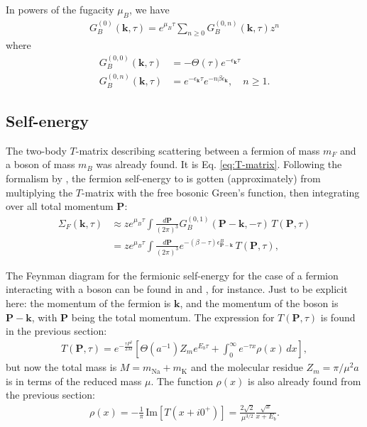\documentclass{article}
\theoremstyle{definition}
\begin{document}
\noindent In powers of the fugacity $\mu_B$, we have
\begin{align}
G^{(0)}_B(\mathbf{k}, \tau) = e^{\mu_B \tau} \sum_{n\geq 0} G_B^{(0,n)} (\mathbf{k}, \tau) z^n
\end{align}
where
\begin{align}
G_B^{(0,0)} (\mathbf{k}, \tau) &= -\Theta(\tau)e^{-\epsilon_\mathbf{k}\tau} \\
G_B^{(0,n)} (\mathbf{k}, \tau) &= e^{-\epsilon_\mathbf{k}\tau} e^{-n\beta \epsilon_\mathbf{k}}, \quad n\geq 1.
\end{align} 


\subsection{Self-energy}

\noindent The two-body $T$-matrix describing scattering between a fermion of mass $m_F$ and a boson of mass $m_B$ was already found. It is Eq. \eqref{eq:T-matrix}. Following the formalism by \cite{sun2015high}, the fermion self-energy to is gotten (approximately) from multiplying the $T$-matrix with the free bosonic Green's function, then integrating over all total momentum $\mathbf{P}$:
\begin{align}
\Sigma_F(\mathbf{k}, \tau) 
&\approx z e^{\mu_B \tau}\int \frac{d\mathbf{P}}{(2\pi)^3} G_B^{(0,1)}(\mathbf{P} - \mathbf{k}, -\tau) \, T(\mathbf{P}, \tau) \\
&=  z e^{\mu_B \tau} \int \frac{d\mathbf{P}}{(2\pi)^3} e^{-(\beta - \tau)\epsilon^B_{\mathbf{P}-\mathbf{k}}} \, T(\mathbf{P}, \tau),
\end{align}

\noindent The Feynman diagram for the fermionic self-energy for the case of a fermion interacting with a boson can be found in \cite{kharga2017single} and \cite{manabe2019single}, for instance. Just to be explicit here: the momentum of the fermion is $\mathbf{k}$, and the momentum of the boson is $\mathbf{P} - \mathbf{k}$, with $\mathbf{P}$ being the total momentum. The expression for $T(\mathbf{P}, \tau)$ is found in the previous section:
\begin{align}
T(\mathbf{P}, \tau) = e^{-\frac{\tau P^2}{2M}} \left[ \Theta(a^{-1}) Z_m e^{E_b \tau} + \int_0^\infty e^{-\tau x} \rho(x)\,dx\right],
\end{align}
but now the total mass is $M = m_\text{Na} + m_\text{K}$ and the molecular residue $Z_m = \pi / \mu^2 a$ is in terms of the reduced mass $\mu$. The function $\rho(x)$ is also already found from the previous section:
\begin{align}
\rho(x) 
= -\frac{1}{\pi} \,\text{Im}[T(x + i0^+)] 
= \frac{2\sqrt{2}}{\mu^{3/2}} \frac{\sqrt{x}}{x + E_b}.
\end{align}
\end{document}

